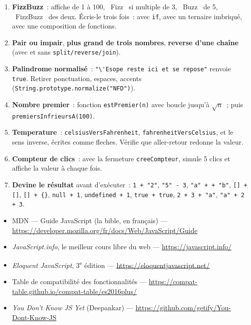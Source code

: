\begin{exercice}
\begin{enumerate}
  \item \textbf{FizzBuzz}~: affiche de 1 \`a 100, \og ~Fizz~ \fg{} si multiple de 3, \og ~Buzz~ \fg{} de 5,
        \og ~FizzBuzz~ \fg{} des deux. \'Ecris-le trois fois~: avec \verb|if|, avec un ternaire imbriqu\'e,
        avec une composition de fonctions.
  \item \textbf{Pair ou impair}, \textbf{plus grand de trois nombres}, \textbf{reverse d'une cha\^ine}
        (avec et sans \verb|split/reverse/join|).
  \item \textbf{Palindrome normalis\'e}~: \verb|"\'Esope reste ici et se repose"| renvoie \verb|true|.
        Retirer ponctuation, espaces, accents (\verb|String.prototype.normalize("NFD")|).
  \item \textbf{Nombre premier}~: fonction \verb|estPremier(n)| avec boucle jusqu'\`a
        $\sqrt{n}$~; puis \verb|premiersInfrieursA(100)|.
  \item \textbf{Temperature}~: \verb|celsiusVersFahrenheit|, \verb|fahrenheitVersCelsius|,
        et le sens inverse, \'ecrites comme fleches. V\'erifie que aller-retour redonne la valeur.
  \item \textbf{Compteur de clics}~: avec la fermeture \verb|creeCompteur|, simule 5 clics
        et affiche la valeur \`a chaque fois.
  \item \textbf{Devine le r\'esultat} avant d'ex\'ecuter~: \verb|1 + "2"|, \verb|"5" - 3|,
        \verb|"a" + + "b"|, \verb|[] + []|, \verb|[] + {}|, \verb|null + 1|,
        \verb|undefined + 1|, \verb|true + true|, \verb|2 + 3 + "a"|, \verb|"a" + 2 + 3|.
\end{enumerate}
\end{exercice}

\begin{ressources}
\begin{itemize}
  \item MDN --- Guide JavaScript (la bible, en fran\c{c}ais) --- \url{https://developer.mozilla.org/fr/docs/Web/JavaScript/Guide}
  \item \emph{JavaScript.info}, le meilleur cours libre du web --- \url{https://javascript.info/}
  \item \emph{Eloquent JavaScript}, 3\textsuperscript{e} \'edition --- \url{https://eloquentjavascript.net/}
  \item Table de compatibilit\'e des fonctionnalit\'es --- \url{https://compat-table.github.io/compat-table/es2016plus/}
  \item \emph{You Don't Know JS Yet} (Deepankar) --- \url{https://github.com/getify/You-Dont-Know-JS}
\end{itemize}
\end{ressources}

